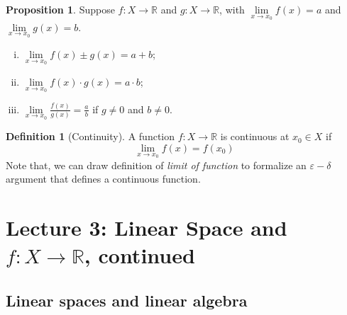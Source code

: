 \documentclass[12pt]{article}
\newcommand{\R}{{\mathbb R}}
\theoremstyle{definition}
\newtheorem{definition}[theorem]{Definition}
\newtheorem{proposition}[theorem]{Proposition}
\theoremstyle{plain}
\begin{document}
\begin{proposition}
    Suppose $f: X \to \R$ and $g: X \to \R$, with $\underset{x\to x_0} \lim 
    f(x) = a$ and $\underset{x\to x_0} \lim g(x) = b$.
    \begin{enumerate}[(i)]
        \item $\underset{x\to x_0} \lim f(x) \pm g(x) = a + b$;
        \item $\underset{x\to x_0} \lim f(x) \cdot g(x) = a\cdot b$;
        \item $\underset{x\to x_0} \lim \frac{f(x)}{g(x)} = \frac{a}{b}$ if $g 
            \not= 0$ and $b \not= 0$.
    \end{enumerate}
\end{proposition}

\begin{definition}
    [Continuity] A function $f: X \to \R$ is continuous at $x_0 \in X$ if 
    \[
        \underset{x\to x_0} \lim f(x) = f(x_0)
    \]
    Note that, we can draw definition of \textit{limit of function} to formalize 
    an $\varepsilon-\delta$ argument that defines a continuous function.
\end{definition}


\section{Lecture 3: Linear Space and $f: X \to \R$, continued}

\subsection{Linear spaces and linear algebra}
\end{document}
